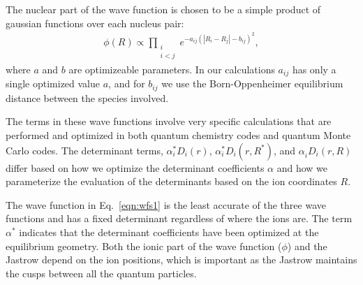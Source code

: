 \documentclass[aip,jcp,numerical,reprint]{revtex4-1}
\begin{document}
The nuclear part of the wave function is chosen to be a simple product of gaussian functions over each nucleus pair: 
\begin{align}
\phi(R) \propto \prod_{\substack{i \\ i<j}} e^{-a_{ij}\left(|R_{i}-R_{j}|-b_{ij}\right)^2}, 
\end{align}
where $a$ and $b$ are optimizeable parameters. In our calculations $a_{ij}$ has only a single optimized value $a$, and for $b_{ij}$ we use the Born-Oppenheimer equilibrium distance between the species involved.

The terms in these wave functions involve very specific calculations that are performed and optimized in both quantum chemistry codes and quantum Monte Carlo codes.  
The determinant terms, $\alpha_{i}^{*}D_{i}(r) $, $\alpha_{i}^{*}D_{i}(r,R^{*}) $, and $\alpha_{i}^{}D_{i}(r,R)$ differ based on how we optimize the determinant coefficients $\alpha$ and how we parameterize the evaluation of the determinants based on the ion coordinates $R$.   

The  wave function in Eq.~\eqref{eqn:wfs1} is the least accurate of the three wave functions and has a fixed determinant regardless of where the ions are.  The term $\alpha^{*}$ indicates that the determinant coefficients have been optimized at the equilibrium geometry.  
Both the ionic part of the wave function ($\phi$) and the Jastrow depend on the ion positions, which is important as the Jastrow maintains the cusps between all the quantum particles.  
\end{document}
